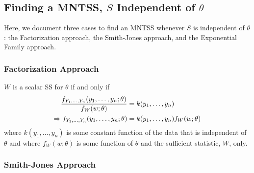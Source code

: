 \documentclass[a4paper,12pt]{scrartcl}
\begin{document}
\newpage
\subsection{Finding a MNTSS, $S$ Independent of $\theta$}

Here, we document three cases to find an MNTSS whenever $S$ is 
independent of $\theta$: the Factorization
approach, the Smith-Jones approach, and the Exponential Family 
approach.

\subsubsection{Factorization Approach}

$W$ is a scalar SS for $\theta$ if and only if 
\begin{align}
   \label{factor}
   \frac{f_{Y_1,\dots,Y_n}(y_1, \ldots, y_n; \theta)}{
      f_W(w; \theta)} &= k(y_1,\ldots,y_n)  
      \notag\\
   \Rightarrow f_{Y_1,\dots,Y_n}(y_1, \ldots, y_n; \theta) &= 
      k(y_1,\ldots,y_n) f_W(w; \theta)
\end{align}
where $k(y_1, \ldots, y_n)$ is some constant function of the data
that is independent of $\theta$ and where $f_W(w; \theta)$ is
some function of $\theta$ and the sufficient statistic, $W$, only.

\subsubsection{Smith-Jones Approach}
\end{document}
